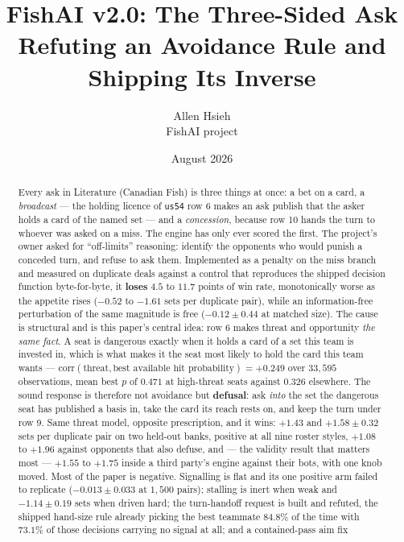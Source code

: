 \documentclass[11pt]{article}
\title{FishAI v2.0: The Three-Sided Ask\\ Refuting an Avoidance Rule and Shipping Its Inverse}
\author{Allen Hsieh\\[2pt] {\small FishAI project}}
\date{August 2026}
\newcommand{\code}[1]{\texttt{#1}}
\newcommand{\usff}{\code{us54}}
\begin{document}
\maketitle

\begin{abstract}
\noindent Every ask in Literature (Canadian Fish) is three things at once: a bet on a card, a
\emph{broadcast} --- the holding licence of \usff{} row 6 makes an ask publish that the asker holds
a card of the named set --- and a \emph{concession}, because row 10 hands the turn to whoever was
asked on a miss. The engine has only ever scored the first. The project's owner asked for
``off-limits'' reasoning: identify the opponents who would punish a conceded turn, and refuse to ask
them. Implemented as a penalty on the miss branch and measured on duplicate deals against a control
that reproduces the shipped decision function byte-for-byte, it \textbf{loses} $4.5$ to $11.7$
points of win rate, monotonically worse as the appetite rises ($-0.52$ to $-1.61$ sets per duplicate
pair), while an information-free perturbation of the same magnitude is free ($-0.12 \pm 0.44$ at
matched size). The cause is structural and is this paper's central idea: row 6 makes threat and
opportunity \emph{the same fact}. A seat is dangerous exactly when it holds a card of a set this
team is invested in, which is what makes it the seat most likely to hold the card this team wants
--- $\mathrm{corr}(\text{threat}, \text{best available hit probability}) = +0.249$ over $33{,}595$
observations, mean best $p$ of $0.471$ at high-threat seats against $0.326$ elsewhere. The sound
response is therefore not avoidance but \textbf{defusal}: ask \emph{into} the set the dangerous seat
has published a basis in, take the card its reach rests on, and keep the turn under row 9. Same
threat model, opposite prescription, and it wins: $+1.43$ and $+1.58 \pm 0.32$ sets per duplicate
pair on two held-out banks, positive at all nine roster styles, $+1.08$ to $+1.96$ against opponents
that also defuse, and --- the validity result that matters most --- $+1.55$ to $+1.75$ inside a
third party's engine against their bots, with one knob moved. Most of the paper is negative.
Signalling is flat and its one positive arm failed to replicate ($-0.013 \pm 0.033$ at $1{,}500$
pairs); stalling is inert when weak and $-1.14 \pm 0.19$ sets when driven hard; the turn-handoff
request is built and refuted, the shipped hand-size rule already picking the best teammate $84.8\%$
of the time with $73.1\%$ of those decisions carrying no signal at all; and a contained-pass aim fix

\end{abstract}
\end{document}
